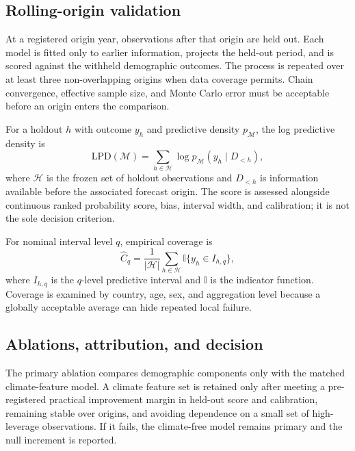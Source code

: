 \documentclass[conference]{IEEEtran}
\newcommand{\lpd}{\mathrm{LPD}}
\begin{document}
\subsection{Rolling-origin validation}

At a registered origin year, observations after that origin are held out. Each model is fitted only to earlier information, projects the held-out period, and is scored against the withheld demographic outcomes. The process is repeated over at least three non-overlapping origins when data coverage permits. Chain convergence, effective sample size, and Monte Carlo error must be acceptable before an origin enters the comparison.

For a holdout $h$ with outcome $y_h$ and predictive density $p_{\mathcal{M}}$, the log predictive density is
\begin{equation}
\lpd(\mathcal{M})=\sum_{h\in\mathcal{H}}\log p_{\mathcal{M}}(y_h\mid D_{<h}),
\label{eq:lpd}
\end{equation}
where $\mathcal{H}$ is the frozen set of holdout observations and $D_{<h}$ is information available before the associated forecast origin. The score is assessed alongside continuous ranked probability score, bias, interval width, and calibration; it is not the sole decision criterion.

For nominal interval level $q$, empirical coverage is
\begin{equation}
\widehat{C}_{q}=\frac{1}{|\mathcal{H}|}\sum_{h\in\mathcal{H}}\mathbb{I}\{y_h\in I_{h,q}\},
\label{eq:coverage}
\end{equation}
where $I_{h,q}$ is the $q$-level predictive interval and $\mathbb{I}$ is the indicator function. Coverage is examined by country, age, sex, and aggregation level because a globally acceptable average can hide repeated local failure.

\subsection{Ablations, attribution, and decision}

The primary ablation compares demographic components only with the matched climate-feature model. A climate feature set is retained only after meeting a pre-registered practical improvement margin in held-out score and calibration, remaining stable over origins, and avoiding dependence on a small set of high-leverage observations. If it fails, the climate-free model remains primary and the null increment is reported.
\end{document}
